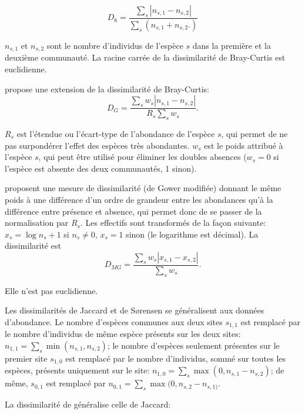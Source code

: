 \documentclass[
  11pt,
  french,
  a4paper,
  extrafontsizes,onecolumn,openright
  ]{memoir}
\begin{document}
\begin{equation}
  \label{eq:BrayCurtis}
  D_{8} = \frac{\sum_s{\left| n_{s,1}-n_{s,2} \right|}}{\sum_s{\left( n_{s,1}+n_{s,2}. \right)}}
\end{equation}

\(n_{s,1}\) et \(n_{s,2}\) sont le nombre d'individus de l'espèce \(s\) dans la première et la deuxième communauté.
La racine carrée de la dissimilarité de Bray-Curtis est euclidienne.

\textcite{Gower1971} propose une extension de la dissimilarité de Bray-Curtis:
\begin{equation}
  \label{eq:Gower1971}
  D_{G} = \frac{\sum_s{w_s\left| n_{s,1}-n_{s,2} \right|}}{R_s\sum_s{w_s}}.
\end{equation}

\(R_s\) est l'étendue ou l'écart-type de l'abondance de l'espèce \(s\), qui permet de ne pas surpondérer l'effet des espèces très abondantes.
\(w_s\) est le poids attribué à l'espèce \(s\), qui peut être utilisé pour éliminer les doubles absences (\(w_s=0\) si l'espèce est absente des deux communautés, 1 sinon).

\textcite{Anderson2006} proposent une mesure de dissimilarité (de Gower modifiée) donnant le même poids à une différence d'un ordre de grandeur entre les abondances qu'à la différence entre présence et absence, qui permet donc de se passer de la normalisation par \(R_s\).
Les effectifs sont transformés de la façon suivante: \(x_s=\log n_s +1\) si \(n_s \ne 0\), \(x_s=1\) sinon (le logarithme est décimal).
La dissimilarité est
\begin{equation}
  \label{eq:MG}
  D_{\mathit{MG}} = \frac{\sum_s{w_s\left| x_{s,1}-x_{s,2} \right|}}{\sum_s{w_s}}.
\end{equation}

Elle n'est pas euclidienne.

Les dissimilarités de Jaccard et de Sørensen se généralisent aux données d'abondance.
Le nombre d'espèces communes aux deux sites \(s_{1,1}\) est remplacé par le nombre d'individus de même espèce présents sur les deux sites: \(n_{1,1}=\sum_s{\min(n_{s,1}, n_{s,2})}\); le nombre d'espèces seulement présentes sur le premier site \(s_{1,0}\) est remplacé par le nombre d'individus, sommé sur toutes les espèces, présents uniquement sur le site: \(n_{1,0}=\sum_s{\max(0, n_{s,1}-n_{s,2})}\); de même, \(s_{0,1}\) est remplacé par \(n_{0,1}=\sum_s{\max(0, n_{s,2}-n_{s,1)}}\).

La dissimilarité de \textcite{Ruzicka1958} généralise celle de Jaccard:
\end{document}

